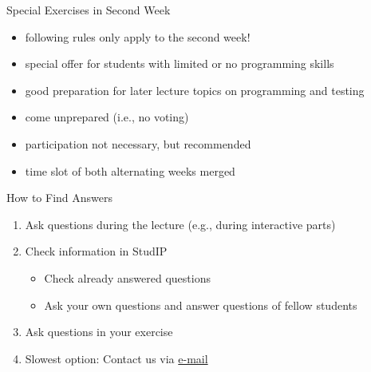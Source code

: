 \begin{frame}{\insertsubsection}
	\begin{fancycolumns}[animation=none]
		\begin{definition}{Special Exercises in Second Week}
			\begin{itemize}
				\item following rules only apply to the second week!
				\item special offer for students with limited or no programming skills
				\item good preparation for later lecture topics on programming and testing
				\item come unprepared (i.e., no voting)
				\item participation not necessary, but recommended
				\item time slot of both alternating weeks merged
			\end{itemize}
		\end{definition}
		\nextcolumn
		\begin{definition}{How to Find Answers}
			\begin{enumerate}
				\item<+-> Ask questions during the lecture (e.g., during interactive parts)
				\item<+-> Check information in StudIP
				\begin{itemize}
					\item Check already answered questions
					\item Ask your own questions and answer questions of fellow students
				\end{itemize}
				\item<+-> Ask questions in your exercise
				\item<+-> Slowest option: Contact us via  \href{mailto:christopher.rau@tu-braunschweig.de?cc=thomas.thuem@tu-braunschweig.de&subject=[SE1]}{e-mail}
			\end{enumerate}
		\end{definition}
	\end{fancycolumns}
\end{frame}

